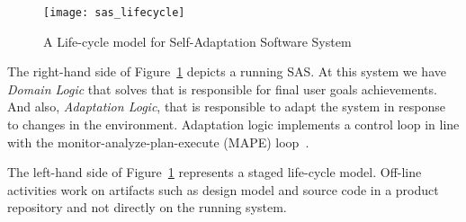 \begin{figure}[!htb]
  \centering
  \texttt{[image: sas\_lifecycle]}
  \caption{A Life-cycle model for Self-Adaptation Software System\cite{andersson_software_2013}}
  \label{fig:sas_lifecycle}
\end{figure}

The right-hand side of Figure~\ref{fig:sas_lifecycle} depicts a running SAS. At this system we have \emph{Domain Logic} that solves that is responsible for final user goals achievements. And also, \emph{Adaptation Logic}, that is responsible to adapt the system in response to changes in the environment. Adaptation logic implements a control loop in line with the monitor-analyze-plan-execute (MAPE) loop~\cite{kephart_vision_2003}.

The left-hand side of Figure~\ref{fig:sas_lifecycle} represents a staged life-cycle model. Off-line activities work on artifacts such as design model and source code in a product repository and not directly on the running system.
